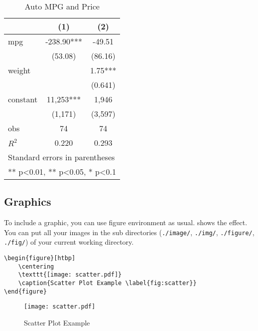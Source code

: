 \documentclass[11pt]{elegantpaper}
\begin{document}
\begin{table}[htbp]
  \small
  \centering
  \caption{Auto MPG and Price \label{tab:reg}}
    \begin{tabular}{lcc}
    \toprule
                    &       (1)         &        (2)      \\
    \midrule
    mpg             &    -238.90***     &      -49.51     \\
                    &     (53.08)       &      (86.16)    \\
    weight          &                   &      1.75***    \\
                    &                   &      (0.641)    \\
    constant        &     11,253***     &       1,946     \\
                    &     (1,171)       &      (3,597)   \\
    obs             &        74         &         74     \\
    $R^2$           &      0.220        &       0.293    \\
    \bottomrule
    \multicolumn{3}{l}{\scriptsize Standard errors in parentheses} \\
    \multicolumn{3}{l}{\scriptsize *** p<0.01, ** p<0.05, * p<0.1} \\
    \end{tabular}%
\end{table}%



\subsection{Graphics}
To include a graphic, you can use figure environment as usual.  shows the effect. You can put all your images in the sub directories (\lstinline{./image/}, \lstinline{./img/}, \lstinline{./figure/}, \lstinline{./fig/}) of your current working directory.

\begin{lstlisting}
\begin{figure}[htbp]
	\centering
	\texttt{[image: scatter.pdf]}
	\caption{Scatter Plot Example \label{fig:scatter}}
\end{figure}
\end{lstlisting}
\begin{figure}[htbp]
	\centering
	\texttt{[image: scatter.pdf]}
	\caption{Scatter Plot Example \label{fig:scatter}}
\end{figure}
\end{document}

